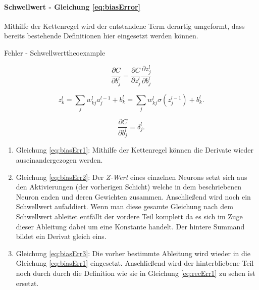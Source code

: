 \paragraph{Schwellwert - Gleichung \ref{eq:biasError}}
Mithilfe der Kettenregel wird der entstandene Term derartig umgeformt, dass bereits bestehende Definitionen hier eingesetzt werden können.

\begin{myderivation}{Fehler - Schwellwert}{theoexample}

\begin{equation} \label{eq:biasErr1}
\frac{\partial C}{\partial b^l_j} = \frac{\partial C}{\partial z^l_j} \frac{\partial z^l_j}{\partial b^l_j}
\end{equation}

\begin{equation} \label{eq:biasErr2}
z^{l}_k = \sum_j w^{l}_{kj} a^{l-1}_j +b^l_k = \sum_j w^l_{kj} \sigma(z^{l-1}_j) +b^l_k.
\end{equation}


\begin{equation} \label{eq:biasErr3}
\frac{\partial C}{\partial b^l_j} = \delta^l_j.
\end{equation}

\end{myderivation}


\begin{enumerate}

\item Gleichung \ref{eq:biasErr1}: Mithilfe der Kettenregel können die Derivate wieder auseinandergezogen werden.

\item Gleichung \ref{eq:biasErr2}: Der \emph{Z-Wert} eines einzelnen Neurons setzt sich aus den Aktivierungen (der vorherigen Schicht) welche in dem beschriebenen Neuron enden und deren Gewichten zusammen. Anschließend wird noch ein Schwellwert aufaddiert. Wenn man diese gesamte Gleichung nach dem Schwellwert ableitet entfällt der vordere Teil komplett da es sich im Zuge dieser Ableitung dabei um eine Konstante handelt. Der hintere Summand bildet ein Derivat gleich eins.

\item Gleichung \ref{eq:biasErr3}: Die vorher bestimmte Ableitung wird wieder in die Gleichung \ref{eq:biasErr1} eingesetzt. Anschließend wird der hinterbliebene Teil noch durch durch die Definition wie sie in Gleichung \ref{eq:recErr1} zu sehen ist ersetzt.

\end{enumerate}




